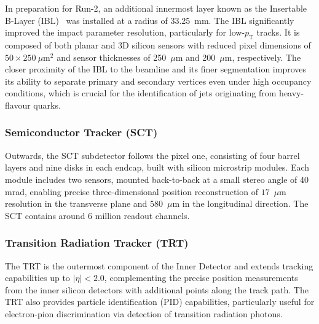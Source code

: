 In preparation for Run-2, an additional innermost layer known as the Insertable B-Layer (IBL)~\cite{IBL} was installed at a radius of 33.25~mm. The IBL significantly improved the impact parameter resolution, particularly for low-$p_{\mathrm{T}}$ tracks. It is composed of both planar and 3D silicon sensors with reduced pixel dimensions of $50 \times 250~\mu\text{m}^2$ and sensor thicknesses of 250~$\mu$m and 200~$\mu$m, respectively. The closer proximity of the IBL to the beamline and its finer segmentation improves its ability to separate primary and secondary vertices even under high occupancy conditions, which is crucial for the identification of jets originating from heavy-flavour quarks.


\subsubsection*{Semiconductor Tracker (SCT)}

Outwards, the SCT subdetector follows the pixel one, consisting of four barrel layers and nine disks in each endcap, built with silicon microstrip modules. Each module includes two sensors, mounted back-to-back at a small stereo angle of 40 mrad, enabling precise three-dimensional position reconstruction of $17$~$\mu$m resolution in the transverse plane and $580$~$\mu$m in the longitudinal direction. 
The SCT contains around 6 million readout channels.

\subsubsection*{Transition Radiation Tracker (TRT)}

The TRT is the outermost component of the Inner Detector and extends tracking capabilities up to $|\eta| < 2.0$, complementing the precise position measurements from the inner silicon detectors with additional points along the track path. The TRT also provides particle identification (PID) capabilities, particularly useful for electron-pion discrimination via detection of transition radiation photons.

